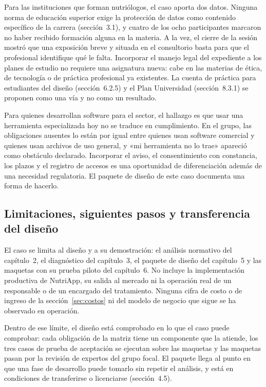 \documentclass[12pt, a4paper]{article}
\begin{document}
Para las instituciones que forman nutriólogos, el caso aporta dos datos.
Ninguna norma de educación superior exige la protección de datos como
contenido específico de la carrera (sección~3.1), y cuatro de los ocho
participantes marcaron no haber recibido formación alguna en la materia. A la vez,
el cierre de la sesión mostró que una exposición breve y situada en el
consultorio basta para que el profesional identifique qué le falta.
Incorporar el manejo legal del expediente a los planes de estudio no
requiere una asignatura nueva: cabe en las materias de ética, de
tecnología o de práctica profesional ya existentes. La cuenta de
práctica para estudiantes del diseño (sección~6.2.5) y el Plan
Universidad (sección~8.3.1) se proponen como una vía y no como un
resultado.

Para quienes desarrollan software para el sector, el hallazgo es que
usar una herramienta especializada hoy no se traduce en cumplimiento. En
el grupo, las obligaciones ausentes lo están por igual entre quienes
usan software comercial y quienes usan archivos de uso general, y «mi
herramienta no lo trae» apareció como obstáculo declarado. Incorporar el
aviso, el consentimiento con constancia, los plazos y el registro de
accesos es una oportunidad de diferenciación además de una necesidad
regulatoria. El paquete de diseño de este caso documenta una forma de
hacerlo.

\subsection{Limitaciones, siguientes pasos y transferencia del diseño}
El caso se limita al diseño y a su demostración: el análisis normativo
del capítulo~2, el diagnóstico del capítulo~3, el paquete de diseño del
capítulo~5 y las maquetas con su prueba piloto del capítulo~6. No
incluye la implementación productiva de NutriApp, su salida al mercado
ni la operación real de un responsable o de un encargado del
tratamiento. Ninguna cifra de costo o de ingreso de la
sección~\ref{sec:costos} ni del modelo de negocio que sigue se ha
observado en operación.

Dentro de ese límite, el diseño está comprobado en lo que el caso puede
comprobar: cada obligación de la matriz tiene un componente que la
atiende, los tres casos de prueba de aceptación se ejecutan sobre las
maquetas y las maquetas pasan por la revisión de expertos del grupo
focal. El paquete llega al punto en que una fase de desarrollo puede
tomarlo sin repetir el análisis, y está en condiciones de transferirse o
licenciarse (sección~4.5).
\end{document}
